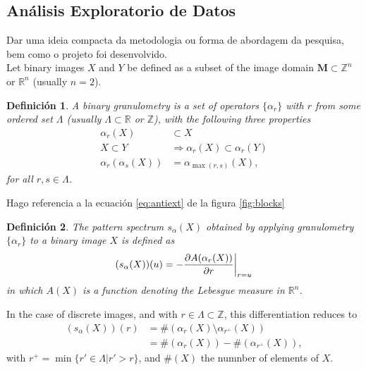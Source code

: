 \documentclass{sciposter}
\newtheorem{Def}{Definici\'on}
\begin{document}
\begin{multicols}{3}
\section{An\'alisis Exploratorio de Datos}
Dar uma ideia compacta da metodologia ou forma de abordagem da pesquisa, bem como o projeto foi desenvolvido.\\

Let binary images $X$ and $Y$ be defined as a subset of the image domain 
${\mathbf M}\subset {\mathbb Z}^n$ or ${\mathbb R}^n$ (usually $n=2$). 
\begin{Def} %
A binary 
granulometry is a set of operators $\{\alpha_r\}$ with $r$ from some ordered 
set $\Lambda$ (usually $\Lambda \subset {\mathbb R}$ or ${\mathbb Z}$), with 
the following three properties
\begin{align}
   \alpha_r(X) & \subset  X \label{eq:antiext} \\
   X \subset Y & \Rightarrow \alpha_r(X) \subset \alpha_r(Y) 
   \label{eq:increasing} \\
   \alpha_r(\alpha_s(X)) & =  \alpha_{\max(r,s)}(X) \label{eq:idempot},
\end{align}   
for all $r,s \in \Lambda$.
\end{Def}

Hago referencia a la ecuaci\'on \ref{eq:antiext} de la figura \ref{fig:blocks}

\begin{Def}
The pattern spectrum $s_{\alpha}(X)$ obtained by applying 
granulometry $\{\alpha_r\}$ to a binary image $X$ is defined as
\begin{equation}
    (s_{\alpha}(X))(u) = 
    - \frac{\partial A(\alpha_r(X))}{\partial r}\bigg{\vert}_{r=u}
\end{equation}
in which $A(X)$ is a function denoting the Lebesgue measure in 
${\mathbb R}^n$.
\end{Def} 
In the case of discrete images, and with $r \in \Lambda \subset {\mathbb Z}$, 
this differentiation reduces to
\begin{align}
    (s_{\alpha}(X))(r)  & = \#(\alpha_{r}(X) \setminus \alpha_{r^+}(X)) \\ 
                        & = \#(\alpha_{r}(X)) - \#(\alpha_{r^+}(X)), 
\end{align}
with $r^+ = \min\{ r' \in \Lambda \vert r' > r \}$, and $\#(X)$ the 
numnber of elements of $X$.


\end{multicols}
\end{document}
